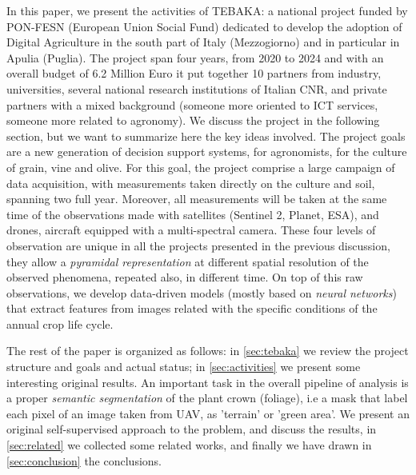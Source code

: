\documentclass[comsoc,final]{IEEEtran}
\begin{document}
In this paper, we present the activities of \textsc{TEBAKA}: a national project funded by PON-FESN (European Union Social Fund) dedicated to develop the adoption of Digital Agriculture in the south part of Italy (Mezzogiorno) and in particular in Apulia (Puglia). The project span four years, from 2020 to 2024 and with an overall budget of 6.2 Million Euro it put together 10 partners from industry, universities, several national research institutions of Italian CNR, and private partners with a mixed background (someone more oriented to ICT services, someone more related to agronomy). 
We discuss the project in the following section, but we want to summarize here the key ideas involved. The project goals are a new generation of decision support systems, for agronomists, for the culture of grain, vine and olive. For this goal, the project comprise a large campaign of data acquisition, with measurements taken directly on the culture and soil, spanning two full year. Moreover, all measurements will be taken at the same time of the observations made with satellites  (Sentinel 2, Planet, ESA), and drones, aircraft equipped with a multi-spectral camera. These four levels of observation are unique in all the projects presented in the previous discussion, they allow a \emph{pyramidal representation} at different spatial resolution of the observed phenomena, repeated also, in different time. On top of this raw observations, we develop data-driven models (mostly based on \emph{neural networks}) that extract features from images related with the specific conditions of the annual crop life cycle.

The rest of the paper is organized as follows: in \ref{sec:tebaka} we review the project structure and goals and actual status; in \ref{sec:activities} we present some interesting original results. An important task in the overall pipeline of analysis is a proper \emph{semantic segmentation} of the plant crown (foliage), i.e a mask that label each pixel of an image taken from UAV, as 'terrain' or 'green area'. We present an original self-supervised approach to the problem, and discuss the results, in \ref{sec:related} we collected some related works, and finally we have drawn in \ref{sec:conclusion} the conclusions.
\end{document}
